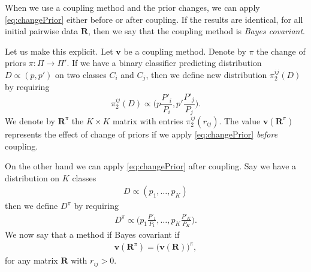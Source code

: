 \documentclass[twoside,11pt]{article}
\begin{document}
When we use a coupling method and the prior changes, we  can apply \eqref{eq:changePrior} either before or after coupling. If the results are identical, for all initial pairwise data $\boldsymbol{R}$, then we say that the coupling method is \emph{Bayes covariant}. 

Let us make this explicit. Let $\boldsymbol{v}$ be a coupling method. Denote by  $\pi$ the change of priors $\pi:\Pi \rightarrow \Pi'$. If we have a  binary classifier predicting distribution $D \propto (p, p')$ on two classes $C_i$ and $C_j$, then we define new distribution $\pi_2^{ij}(D)$ by requiring
$$
\pi_2^{ij}(D) \propto \biggl(p \frac{P'_i}{P_i},p' \frac{P'_j}{P_j}\biggr).
$$
We denote by $\boldsymbol{R}^\pi$ the $K\times K$ matrix with entries $\pi_2^{ij}(r_{ij})$. The value $\boldsymbol{v}(\boldsymbol{R}^\pi)$ represents the effect of change of priors if we apply \eqref{eq:changePrior} \emph{before} coupling.

On the other hand we can apply \eqref{eq:changePrior} after coupling. Say we have a distribution on $K$ classes
\begin{align}
D \propto (p_1, \ldots, p_K)
\end{align}
then we define $D^\pi$ by requiring 
\begin{align}
D^\pi \propto \biggl(p_1 \frac{P'_1}{P_1}, \ldots, p_K \frac{P'_K}{P_K}\biggr).
\end{align}
We now say that a method if Bayes covariant if
\begin{align}
\boldsymbol{v}(\boldsymbol{R}^\pi)=	\bigl(\boldsymbol{v}(\boldsymbol{R})\bigr)^\pi,
\end{align}
for any matrix $\boldsymbol{R}$ with $r_{ij}> 0$.




%
\end{document}
